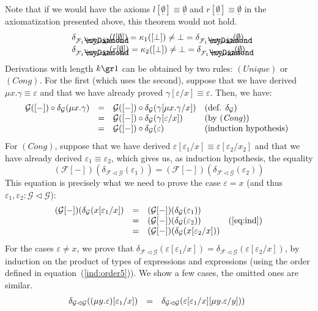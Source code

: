 \documentclass{LMCS}
\newcommand\E\varepsilon
\newcommand\G{\mathcal{G}}
\newcommand\F{\mathcal{F}}
\newcommand\emp{\underline\emptyset}
\newcommand{\myplus}{\mathbin{\rlap{$\myDiamond$}\hspace*{.01cm}\raisebox{.14ex}{$+$}}}
\theoremstyle{definition}
\theoremstyle{plain}
\theoremstyle{plain}
\theoremstyle{plain}
\theoremstyle{plain}
\theoremstyle{definition}
\theoremstyle{definition}
\begin{document}
Note that if we would have the axioms
$l[\emp] \equiv \emp$ and $r[\emp] \equiv \emp$ in
the axiomatization presented above, this theorem would not hold. 
$$
\begin{array}{l}
\delta_{\F_1\myplus \F_2\lhd \G}(l[\emp])
=\kappa_1([\bot])
\neq 
\bot 
=
\delta_{\F_1\myplus \F_2\lhd \G}(\emp)\\
\delta_{\F_1\myplus \F_2\lhd \G}(r[\emp])
=\kappa_2([\bot])
\neq 
\bot 
=
\delta_{\F_1\myplus \F_2\lhd \G}(\emp)

\end{array}
$$
Derivations with length $k\gr1$ can be obtained by two rules:
$(\mathit{Unique})$ or $(\mathit{Cong})$.
For the first (which uses the second), suppose that we have derived $\mu
x.\gamma \equiv \E$ and that we have already proved $\gamma[\E/x] \equiv
\E$. Then, we have:
\[
\begin{array}{@{}lcll}
\G([-])\circ \delta_\G(\mu x.\gamma) 
&=& \G([-])\circ \delta_\G(\gamma [\mu x.\gamma/x]) &\text{(def. $\delta_\G$)}\\
&=& \G([-])\circ \delta_\G(\gamma [\E /x]) &\text{(by $(\mathit{Cong})$)}\\
&{=}& \G([-])\circ \delta_\G(\E)&\text{(induction hypothesis)}
\end{array}
\]
For $(\mathit{Cong})$, suppose that we
have derived $\E[\E_1/x] \equiv \E[\E_2/x_2]$ and that we have already derived
$\E_1\equiv \E_2$, which gives us, as induction hypothesis, the equality
\begin{equation}\label{eq:ind}
(\F [-])(\delta_{\F\lhd \G}(\E_1))=(\F [-])(\delta_{\F\lhd \G}(\E_2))
\end{equation}
This equation is precisely what we need to prove the case  $\E=x$ (and
thus $\E_1,\E_2:\G\lhd \G$): 
\[
\begin{array}{lcll}
(\G [-])(\delta_{\G}(x[\E_1/x] ) &=& (\G[-])(\delta_{\G}(\E_1))\\
&=& (\G [-])(\delta_{\G}(\E_2)) &\text{(\ref{eq:ind})} \\
&=& (\G [-])(\delta_{\G}(x[\E_2/x]))
\end{array}
\]
For the cases $\E\neq x$, we prove that $\delta_{\F\lhd \G}(\E[\E_1/x]) =
\delta_{\F\lhd \G}(\E[\E_2/x])$, by induction on
the product of types of
expressions and expressions
(using the order defined in equation~(\ref{ind:order5})).
We show a few cases, the omitted ones are similar.
\[
\begin{array}{@{}lcl}
\delta_{\G\lhd \G}  ((\mu y. \E)[\E_1/x]) &=& \delta_{\G\lhd \G}
(\E[\E_1/x][\mu y.
\E/y]))\\

\end{array}\]$$
\end{document}
